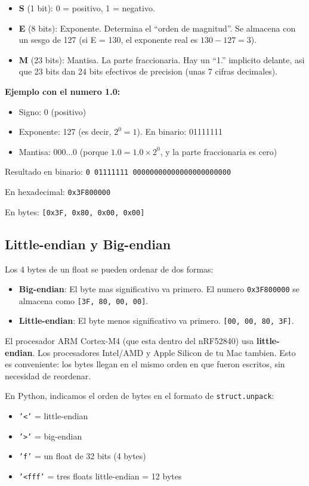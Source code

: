 \documentclass[11pt,a4paper]{article}
\begin{document}
\begin{itemize}
    \item \textbf{S} (1 bit): 0 = positivo, 1 = negativo.
    \item \textbf{E} (8 bits): Exponente. Determina el ``orden de
          magnitud''. Se almacena con un sesgo de 127 (si E = 130,
          el exponente real es $130 - 127 = 3$).
    \item \textbf{M} (23 bits): Mantisa. La parte fraccionaria.
          Hay un ``1.'' implicito delante, asi que 23 bits dan
          24 bits efectivos de precision (unas 7 cifras decimales).
\end{itemize}

\textbf{Ejemplo con el numero 1.0:}
\begin{itemize}
    \item Signo: 0 (positivo)
    \item Exponente: 127 (es decir, $2^0 = 1$). En binario: 01111111
    \item Mantisa: 000...0 (porque $1.0 = 1.0 \times 2^0$, y la
          parte fraccionaria es cero)
\end{itemize}
Resultado en binario: \texttt{0 01111111 00000000000000000000000}

En hexadecimal: \texttt{0x3F800000}

En bytes: \texttt{[0x3F, 0x80, 0x00, 0x00]}

\subsection{Little-endian y Big-endian}

Los 4 bytes de un float se pueden ordenar de dos formas:

\begin{itemize}
    \item \textbf{Big-endian}: El byte mas significativo va primero.
          El numero \texttt{0x3F800000} se almacena como
          \texttt{[3F, 80, 00, 00]}.
    \item \textbf{Little-endian}: El byte menos significativo va
          primero. \texttt{[00, 00, 80, 3F]}.
\end{itemize}

El procesador ARM Cortex-M4 (que esta dentro del nRF52840) usa
\textbf{little-endian}. Los procesadores Intel/AMD y Apple Silicon
de tu Mac tambien. Esto es conveniente: los bytes llegan en el
mismo orden en que fueron escritos, sin necesidad de reordenar.

En Python, indicamos el orden de bytes en el formato de
\texttt{struct.unpack}:
\begin{itemize}
    \item \texttt{'<'} = little-endian
    \item \texttt{'>'} = big-endian
    \item \texttt{'f'} = un float de 32 bits (4 bytes)
    \item \texttt{'<fff'} = tres floats little-endian = 12 bytes
\end{itemize}
\end{document}
